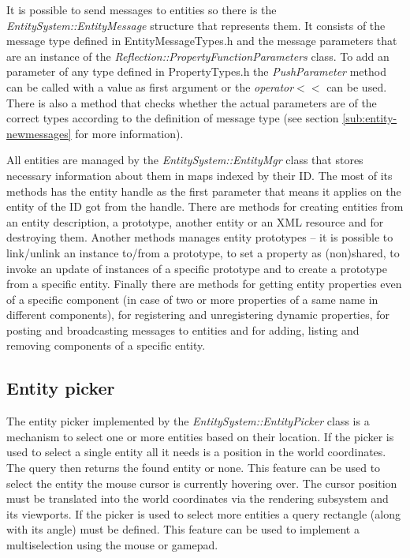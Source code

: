 It is possible to send messages to entities so there is the \emph{EntitySystem::EntityMessage} structure that represents them. It consists of the message type defined in EntityMessageTypes.h and the message parameters that are an instance of the \emph{Reflection::PropertyFunctionParameters} class. To add an parameter of any type defined in PropertyTypes.h the \emph{PushParameter} method can be called with a value as first argument or the \emph{operator}$<<$ can be used. There is also a method that checks whether the actual parameters are of the correct types according to the definition of message type (see section \ref{sub:entity-newmessages} for more information).

All entities are managed by the \emph{EntitySystem::EntityMgr} class that stores necessary information about them in maps indexed by their ID. The most of its methods has the entity handle as the first parameter that means it applies on the entity of the ID got from the handle. There are methods for creating entities from an entity description, a prototype, another entity or an XML resource and for destroying them. Another methods manages entity prototypes -- it is possible to link/unlink an instance to/from a prototype, to set a property as (non)shared, to invoke an update of instances of a specific prototype and to create a prototype from a specific entity. Finally there are methods for getting entity properties even of a specific component (in case of two or more properties of a same name in different components), for registering and unregistering dynamic properties, for posting and broadcasting messages to entities and for adding, listing and removing components of a specific entity.

\subsection{Entity picker}

The entity picker implemented by the \emph{EntitySystem::EntityPicker} class is a mechanism to select one or more entities based on their location. If the picker is used to select a single entity all it needs is a position in the world coordinates. The query then returns the found entity or none. This feature can be used to select the entity the mouse cursor is currently hovering over. The cursor position must be translated into the world coordinates via the rendering subsystem and its viewports. If the picker is used to select more entities a query rectangle (along with its angle) must be defined. This feature can be used to implement a multiselection using the mouse or gamepad.

